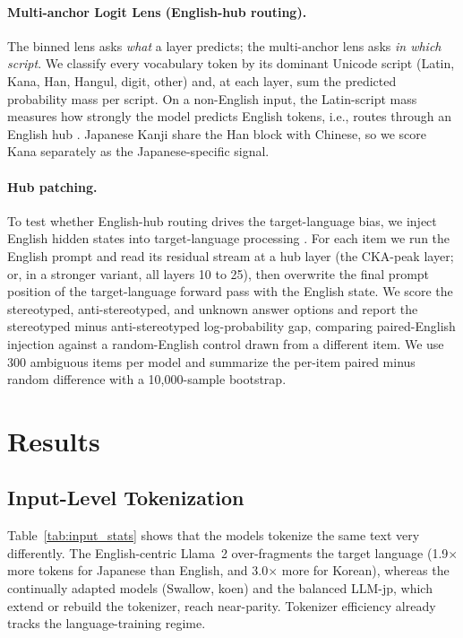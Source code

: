 \documentclass[11pt]{article}
\begin{document}
\paragraph{Multi-anchor Logit Lens (English-hub routing).} The binned lens asks \emph{what} a layer predicts; the multi-anchor lens asks \emph{in which script}. We classify every vocabulary token by its dominant Unicode script (Latin, Kana, Han, Hangul, digit, other) and, at each layer, sum the predicted probability mass per script. On a non-English input, the Latin-script mass measures how strongly the model predicts English tokens, i.e., routes through an English hub \citep{wendler2024llamas}. Japanese Kanji share the Han block with Chinese, so we score Kana separately as the Japanese-specific signal.

\paragraph{Hub patching.} To test whether English-hub routing drives the target-language bias, we inject English hidden states into target-language processing \citep{meng2022locating}. For each item we run the English prompt and read its residual stream at a hub layer (the CKA-peak layer; or, in a stronger variant, all layers 10 to 25), then overwrite the final prompt position of the target-language forward pass with the English state. We score the stereotyped, anti-stereotyped, and unknown answer options and report the stereotyped minus anti-stereotyped log-probability gap, comparing paired-English injection against a random-English control drawn from a different item. We use 300 ambiguous items per model and summarize the per-item paired minus random difference with a 10{,}000-sample bootstrap.

\section{Results}

\subsection{Input-Level Tokenization}

Table~\ref{tab:input_stats} shows that the models tokenize the same text very differently. The English-centric Llama~2 over-fragments the target language (1.9$\times$ more tokens for Japanese than English, and 3.0$\times$ more for Korean), whereas the continually adapted models (Swallow, koen) and the balanced LLM-jp, which extend or rebuild the tokenizer, reach near-parity. Tokenizer efficiency already tracks the language-training regime.
\end{document}
